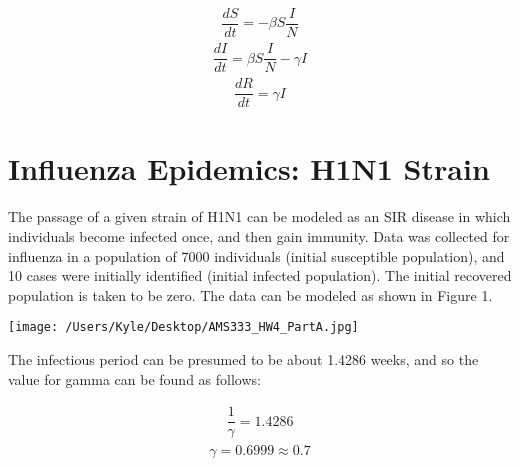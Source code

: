 \documentclass[12pt]{article}
\begin{document}
\begin{gather*}
\dfrac{dS}{dt} = -{\beta}S\dfrac{I}{N}
\end{gather*}
\begin{gather*}
\dfrac{dI}{dt} = {\beta}S\dfrac{I}{N}-{\gamma}I
\end{gather*}
\begin{gather*}
\dfrac{dR}{dt} = {\gamma}I
\end{gather*}
 
\section{Influenza Epidemics: H1N1 Strain}
The passage of a given strain of H1N1 can be modeled as an SIR disease in which individuals become infected once, and then gain immunity. Data was collected for influenza in a population of 7000 individuals (initial susceptible population), and 10 cases were initially identified (initial infected population). The initial recovered population is taken to be zero. The data can be modeled as shown in Figure 1.
\begin{center}
   \texttt{[image: /Users/Kyle/Desktop/AMS333\_HW4\_PartA.jpg]}
\end{center}

The infectious period can be presumed to be about 1.4286 weeks, and so the value for gamma can be found as follows:

\begin{gather*}
\dfrac{1}{\gamma} = 1.4286
\end{gather*}
\begin{gather*}
{\gamma} = 0.6999 \approx0.7
\end{gather*}\
\end{document}
